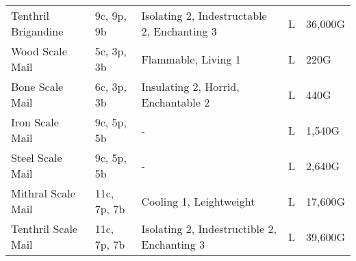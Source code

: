 \begin{longtable}{p{3.5cm} | p{1.5cm} | p{5cm} | p{1cm} | p{1.25cm}}
	Tenthril Brigandine & 9c, 9p, 9b & Isolating 2, Indestructable 2, Enchanting 3 & L & 36,000G\\
	
	Wood Scale Mail & 5c, 3p, 3b & Flammable, Living 1 & L & 220G\\
	
	Bone Scale Mail & 6c, 3p, 3b & Insulating 2, Horrid, Enchantable 2 & L & 440G\\
	
	Iron Scale Mail & 9c, 5p, 5b & - & L & 1,540G\\
	
	Steel Scale Mail & 9c, 5p, 5b & - & L & 2,640G\\
	
	Mithral Scale Mail & 11c, 7p, 7b & Cooling 1, Leightweight & L & 17,600G\\
	
	Tenthril Scale Mail & 11c, 7p, 7b & Isolating 2, Indestructible 2, Enchanting 3 & L & 39,600G\\
\end{longtable}